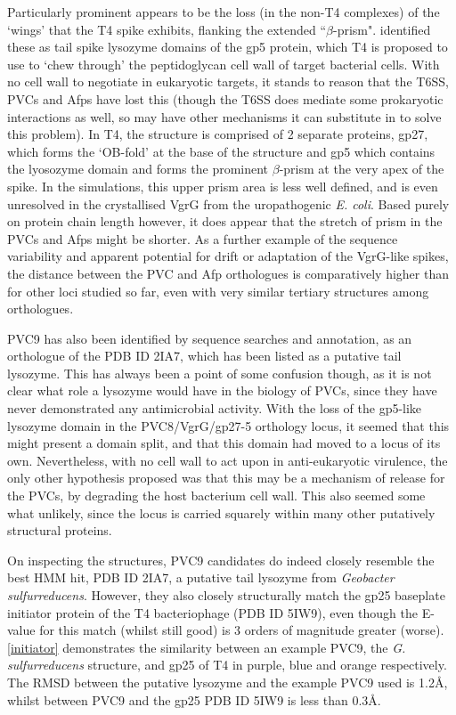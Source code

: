 Particularly prominent appears to be the loss (in the non-T4 complexes) of the `wings' that the T4 spike exhibits, flanking the extended ``$\beta$-prism". \cite{Kanamaru2002a} identified these as tail spike lysozyme domains of the gp5 protein, which T4 is proposed to use to `chew through' the peptidoglycan cell wall of target bacterial cells. With no cell wall to negotiate in eukaryotic targets, it stands to reason that the T6SS, PVCs and Afps have lost this (though the T6SS does mediate some prokaryotic interactions as well, so may have other mechanisms it can substitute in to solve this problem). In T4, the structure is comprised of 2 separate proteins, gp27, which forms the `OB-fold' at the base of the structure and gp5 which contains the lyosozyme domain and forms the prominent $\beta$-prism at the very apex of the spike. In the simulations, this upper prism area is less well defined, and is even unresolved in the crystallised VgrG from the uropathogenic \emph{E. coli}. Based purely on protein chain length however, it does appear that the stretch of prism in the PVCs and Afps might be shorter. As a further example of the sequence variability and apparent potential for drift or adaptation of the VgrG-like spikes, the distance between the PVC and Afp orthologues is comparatively higher than for other loci studied so far, even with very similar tertiary structures among orthologues. 

PVC9 has also been identified by sequence searches and annotation, as an orthologue of the PDB ID 2IA7, which has been listed as a putative tail lysozyme. This has always been a point of some confusion though, as it is not clear what role a lysozyme would have in the biology of PVCs, since they have never demonstrated any antimicrobial activity. With the loss of the gp5-like lysozyme domain in the PVC8/VgrG/gp27-5 orthology locus, it seemed that this might present a domain split, and that this domain had moved to a locus of its own. Nevertheless, with no cell wall to act upon in anti-eukaryotic virulence, the only other hypothesis proposed was that this may be a mechanism of release for the PVCs, by degrading the host bacterium cell wall. This also seemed some what unlikely, since the locus is carried squarely within many other putatively structural proteins.

On inspecting the structures, PVC9 candidates do indeed closely resemble the best HMM hit, PDB ID 2IA7, a putative tail lysozyme from \emph{Geobacter sulfurreducens}. However, they also closely structurally match the gp25 baseplate initiator protein of the T4 bacteriophage (PDB ID 5IW9), even though the E-value for this match (whilst still good) is 3 orders of magnitude greater (worse). \vref{initiator} demonstrates the similarity between an example PVC9, the \emph{G. sulfurreducens} structure, and gp25 of T4 in purple, blue and orange respectively. The RMSD between the putative lysozyme and the example PVC9 used is 1.2\AA, whilst between PVC9 and the gp25 PDB ID 5IW9 is less than 0.3\AA.

